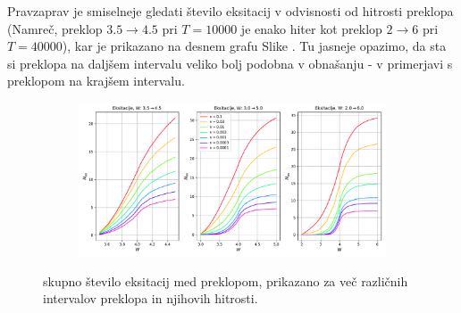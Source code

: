 Pravzaprav je smiselneje gledati število eksitacij v odvisnosti od hitrosti preklopa (Namreč, preklop $3.5 \rightarrow 4.5$ pri $T=10000$ je enako hiter kot preklop $2 \rightarrow 6$ pri $T=40000$), kar je prikazano na desnem grafu Slike \label{fig:Skaliranje}. Tu jasneje opazimo, da sta si preklopa na daljšem intervalu veliko bolj podobna v obnašanju - v primerjavi s preklopom na krajšem intervalu. 
\begin{figure}[H]
\centering
\begin{subfigure}{.99\textwidth}
\includegraphics[width=\linewidth]{Figures/SkoziCas.pdf}
\end{subfigure}
\caption{skupno število eksitacij med preklopom, prikazano za več različnih intervalov preklopa in njihovih hitrosti.}
\label{fig:SkoziCas}
\end{figure}

